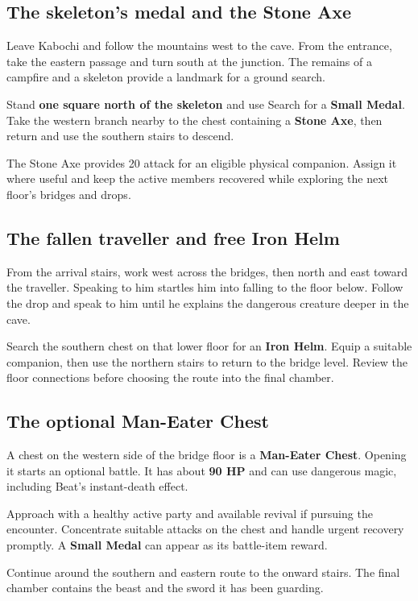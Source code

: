 \subsection*{The skeleton's medal and the Stone Axe}

Leave Kabochi and follow the mountains west to the cave. From the
entrance, take the eastern passage and turn south at the junction.
The remains of a campfire and a skeleton provide a landmark for a
ground search.

Stand \textbf{one square north of the skeleton} and use Search for
a \textbf{Small Medal}. Take the western branch nearby to the chest
containing a \textbf{Stone Axe}, then return and use the southern
stairs to descend.

The Stone Axe provides 20 attack for an eligible physical companion.
Assign it where useful and keep the active members recovered while
exploring the next floor's bridges and drops.

\subsection*{The fallen traveller and free Iron Helm}

From the arrival stairs, work west across the bridges, then north and
east toward the traveller. Speaking to him startles him into falling
to the floor below. Follow the drop and speak to him until he explains
the dangerous creature deeper in the cave.

Search the southern chest on that lower floor for an \textbf{Iron Helm}.
Equip a suitable companion, then use the northern stairs to return to
the bridge level. Review the floor connections before choosing the
route into the final chamber.

\subsection*{The optional Man-Eater Chest}

A chest on the western side of the bridge floor is a
\textbf{Man-Eater Chest}. Opening it starts an optional battle.
It has about \textbf{90 HP} and can use dangerous magic, including
Beat's instant-death effect.

Approach with a healthy active party and available revival if pursuing
the encounter. Concentrate suitable attacks on the chest and handle
urgent recovery promptly. A \textbf{Small Medal} can appear as its
battle-item reward.

Continue around the southern and eastern route to the onward stairs.
The final chamber contains the beast and the sword it has been guarding.

